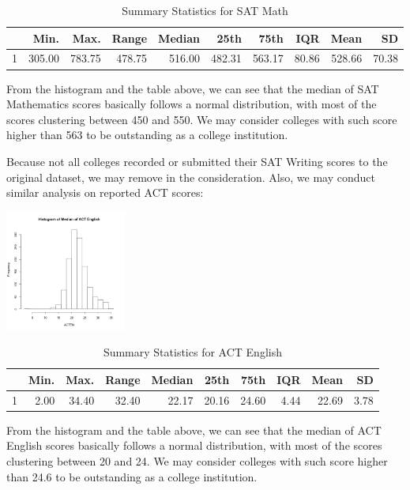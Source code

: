\documentclass{article}\usepackage[]{graphicx}\usepackage[]{color}
\begin{document}
\begin{table}[ht]
\centering
\begin{tabular}{rrrrrrrrrr}
  \hline
 & Min. & Max. & Range & Median & 25th & 75th & IQR & Mean & SD \\ 
  \hline
1 & 305.00 & 783.75 & 478.75 & 516.00 & 482.31 & 563.17 & 80.86 & 528.66 & 70.38 \\ 
   \hline
\end{tabular}
\caption{Summary Statistics for SAT Math} 
\end{table}


From the histogram and the table above, we can see that the median of SAT Mathematics scores basically follows a normal distribution, with most of the scores clustering between 450 and 550. We may consider colleges with such score higher than 563 to be outstanding as a college institution.

Because not all colleges recorded or submitted their SAT Writing scores to the original dataset, we may remove in the consideration. Also, we may conduct similar analysis on reported ACT scores:



{\centering \includegraphics[width=150px]{../../images/histogram-ACTENMedian} 

}


\begin{table}[ht]
\centering
\begin{tabular}{rrrrrrrrrr}
  \hline
 & Min. & Max. & Range & Median & 25th & 75th & IQR & Mean & SD \\ 
  \hline
1 & 2.00 & 34.40 & 32.40 & 22.17 & 20.16 & 24.60 & 4.44 & 22.69 & 3.78 \\ 
   \hline
\end{tabular}
\caption{Summary Statistics for ACT English} 
\end{table}


From the histogram and the table above, we can see that the median of ACT English scores basically follows a normal distribution, with most of the scores clustering between 20 and 24. We may consider colleges with such score higher than 24.6 to be outstanding as a college institution.
\end{document}

